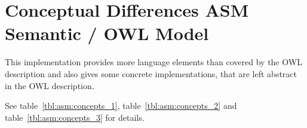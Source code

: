 \footnotesize

\captionsetup{font=footnotesize}

\section{Conceptual Differences ASM Semantic / OWL Model}
\label{CoreASM-Reference-Implementation-Differences-OWL-Model}




\newcommand\OWLClass[1]{{\textcolor{OWLClass}{\textbf{#1}}}}
\newcommand\OWLObjectProperty[1]{{\textcolor{OWLObjectProperty}{\textbf{#1}}}}
\newcommand\OWLDataProperty[1]{{\textcolor{OWLDataProperty}{\textbf{#1}}}}
\newcommand\OWLIndividual[1]{{\textcolor{OWLIndividual}{\textbf{#1}}}}



This implementation provides more language elements than covered by the OWL description and also gives some concrete implementations, that are left abstract in the OWL description.


See table~\ref{tbl:asm:concepts_1}, table~\ref{tbl:asm:concepts_2} and table~\ref{tbl:asm:concepts_3} for details.



